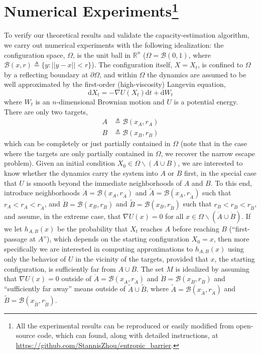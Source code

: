 \documentclass[12pt, nofootinbib,english, amsmath, amssymb, aps, priprint, graphicx,floatfix]{revtex4-1}
\theoremstyle{plain}
\theoremstyle{definition}
\theoremstyle{plain}
\newcommand{\bb}[1]{\mathcal{B}\left(#1\right)}
\newcommand{\dA}{{\dot A}}
\newcommand{\tA}{{\tilde A}}
\newcommand{\dB}{{\dot B}}
\newcommand{\tB}{{\tilde B}}
\begin{document}
 \section{Numerical Experiments\footnote{All the experimental results can be reproduced or easily modified from open-source code, which can found, along with detailed instructions, at \url{https://github.com/StannisZhou/entropic_barrier}.}}\label{sec:Experiments}
To verify our theoretical results and validate the capacity-estimation algorithm, we carry out numerical experiments with the following idealization: the configuration space,
$\Omega$, is the unit ball in $\mathbb{R}^n$
($\Omega = \bb{0,1}$, where $\bb{x, r} \triangleq \{ y : || y - x || < r \}$). The configuration itself, $X=X_t$, is confined to $\Omega$ by a reflecting boundary at $\partial\Omega$, and within $\Omega$ the dynamics are assumed to be well approximated by the first-order (high-viscosity) Langevin equation,
\begin{equation} 
\label{equ:toy_sde}
\mathrm{d} X_t = - \nabla U (X_t) \mathrm{d} t + \mathrm{d} W_t 
\end{equation}
where $W_t$ is an $n$-dimensional Brownian motion and 
$U$ is a potential energy. There are only two targets, 
\begin{align*}
A &\triangleq \bb {x_A, r_A}\\
B &\triangleq \bb {x_B, r_B}
\end{align*}
which can be completely or just partially contained in $\Omega$ (note that in the case where the targets are only partially contained in $\Omega$, we recover the narrow escape problem).
Given an initial condition $X_0\in \Omega \backslash (A\cup B)$, we are interested to know whether the dynamics carry the system into $A$ or $B$ first, in the special case that $U$ is smooth beyond the immediate neighborhoods of $A$ and $B$. To this end, introduce neighborhoods $\dA=\bb{x_A,r_\dA }$ and $\tA=\bb{x_A,r_\tA }$ such that $r_A<r_\dA<r_\tA$, and $\dB=\bb{x_B,r_\dB }$ and $\tB=\bb{x_B,r_\tB }$ such that $r_B<r_\dB<r_\tB$, and assume, in the extreme case,  that $\nabla U(x)=0$ for all $x\in\Omega\backslash (\dA\cup\dB)$.  If we let $h_{A,B}(x)$ be the probability that $X_t$ reaches $A$ before reaching $B$ (``first-passage at $A$''), which depends on the starting configuration $X_0=x$, then more specifically we are interested in computing approximations to $h_{A,B}(x)$ using only the behavior of $U$ in the vicinity of the targets, provided that $x$, the starting configuration, is sufficiently far from $A\cup B$. The set $M$ is idealized by assuming that $\nabla U(x)=0$ outside of $\dA=\bb{x_\dA, r_\dA}$ and $\dB=\bb{x_\dB, r_\dB}$ and ``sufficiently far away'' means outside of $\tA \cup \tB$, where $\tA=\bb{x_\tA, r_\tA}$ and $\tB=\bb{x_\tB, r_\tB}$. 
\end{document}
